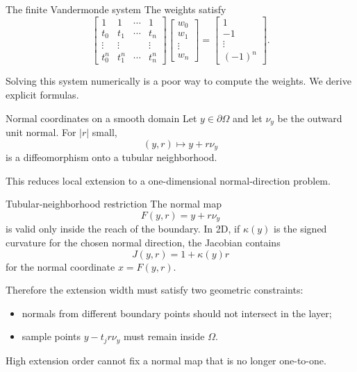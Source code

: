 \documentclass[aspectratio=169,11pt]{beamer}
\begin{document}
\begin{frame}{The finite Vandermonde system}
\small
The weights satisfy
\[
\begin{bmatrix}
1&1&\cdots&1\\
t_0&t_1&\cdots&t_n\\
\vdots&\vdots&&\vdots\\
t_0^n&t_1^n&\cdots&t_n^n
\end{bmatrix}
\begin{bmatrix}
w_0\\w_1\\\vdots\\w_n
\end{bmatrix}
=
\begin{bmatrix}
1\\-1\\\vdots\\(-1)^n
\end{bmatrix}.
\]

\vspace{2mm}
Solving this system numerically is a poor way to compute the weights. We derive explicit formulas.
\end{frame}

\begin{frame}{Normal coordinates on a smooth domain}
\small
Let $y\in\partial\Omega$ and let $\nu_y$ be the outward unit normal.
For $|r|$ small,
\[
  (y,r)\mapsto y+r\nu_y
\]
is a diffeomorphism onto a tubular neighborhood.

\vspace{2mm}
This reduces local extension to a one-dimensional normal-direction problem.
\end{frame}

\begin{frame}{Tubular-neighborhood restriction}
\small
The normal map
\[
  F(y,r)=y+r\nu_y
\]
is valid only inside the reach of the boundary.  In 2D, if $\kappa(y)$ is the
signed curvature for the chosen normal direction, the Jacobian contains
\[
  J(y,r)=1+\kappa(y)r
\]
for the normal coordinate $x=F(y,r)$.

\vspace{1mm}
Therefore the extension width must satisfy two geometric constraints:
\begin{itemize}
  \item normals from different boundary points should not intersect in the layer;
  \item sample points $y-t_jr\nu_y$ must remain inside $\Omega$.
\end{itemize}

\vspace{1mm}
High extension order cannot fix a normal map that is no longer one-to-one.
\end{frame}
\end{document}

